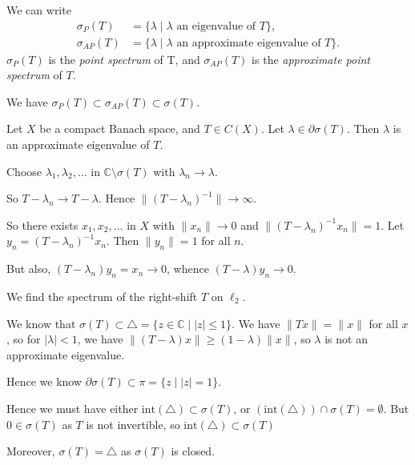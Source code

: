 \documentclass[12pt]{article}
\begin{document}

We can write
\begin{align*}
	\sigma_P(T) &= \{\lambda \mid \lambda \text{ an eigenvalue of }T\},\\
	\sigma_{AP}(T) &= \{\lambda \mid \lambda \text{ an approximate eigenvalue of } T\}.
\end{align*}
$\sigma_P(T)$ is the \emph{point spectrum} of T, and $\sigma_{AP}(T)$ is the \emph{approximate point spectrum} of $T$.

We have $\sigma_P(T) \subset \sigma_{AP}(T) \subset \sigma(T)$.

\begin{theorem}
	Let $X$ be a compact Banach space, and $T \in C(X)$. Let $\lambda \in \partial \sigma(T)$. Then $\lambda$ is an approximate eigenvalue of $T$.
\end{theorem}

\begin{proofbox}
	Choose $\lambda_1, \lambda_2, \ldots$ in $\mathbb{C} \setminus \sigma(T)$ with $\lambda_n \to \lambda$.

	So $T - \lambda_n \to T - \lambda$. Hence $\|(T - \lambda_n)^{-1}\| \to \infty$.

	So there exists $x_1, x_2, \ldots$ in $X$ with $\|x_n\| \to 0$ and $\|(T - \lambda_n)^{-1} x_n\| = 1$. Let $y_n = (T - \lambda_n)^{-1} x_n$. Then $\|y_n\| = 1$ for all $n$.

	But also, $(T - \lambda_n)y_n = x_n \to 0$, whence $(T - \lambda)y_n \to 0$.
\end{proofbox}



\begin{exbox}
	We find the spectrum of the right-shift $T$ on $\ell_2$.

	We know that $\sigma(T) \subset \triangle = \{z \in \mathbb{C} \mid |z| \leq 1\}$. We have $\|Tx\| = \|x\|$ for all $x$, so for $|\lambda| < 1$, we have $\|(T - \lambda)x\| \geq (1-\lambda)\|x\|$, so $\lambda$ is not an approximate eigenvalue.

	Hence we know $\partial \sigma(T) \subset \pi = \{z \mid |z| = 1\}$.

	Hence we must have either $\mathrm{int}(\triangle) \subset \sigma(T)$, or $(\mathrm{int}(\triangle)) \cap \sigma(T) = \emptyset$. But $0 \in \sigma(T)$ as $T$ is not invertible, so $\mathrm{int}(\triangle) \subset \sigma(T)$ 

	Moreover, $\sigma(T) = \triangle$ as $\sigma(T)$ is closed.
\end{exbox}
\end{document}
